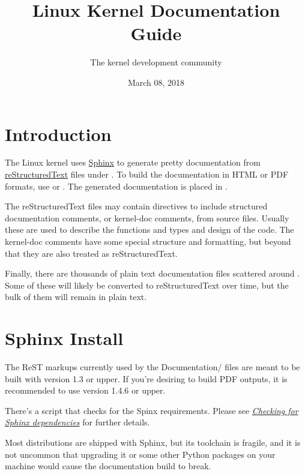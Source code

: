 \documentclass[a4paper,8pt,english]{sphinxmanual}
\title{Linux Kernel Documentation Guide}
\date{March 08, 2018}
\author{The kernel development community}
\begin{document}
\maketitle
\tableofcontents
{}\label{doc-guide/index::doc}



\chapter{Introduction}
\label{doc-guide/sphinx:how-to-write-kernel-documentation}\label{doc-guide/sphinx::doc}\label{doc-guide/sphinx:doc-guide}\label{doc-guide/sphinx:introduction}
The Linux kernel uses \href{http://www.sphinx-doc.org/}{Sphinx} to generate pretty documentation from
\href{http://docutils.sourceforge.net/rst.html}{reStructuredText} files under . To build the documentation in
HTML or PDF formats, use  or . The generated
documentation is placed in .

The reStructuredText files may contain directives to include structured
documentation comments, or kernel-doc comments, from source files. Usually these
are used to describe the functions and types and design of the code. The
kernel-doc comments have some special structure and formatting, but beyond that
they are also treated as reStructuredText.

Finally, there are thousands of plain text documentation files scattered around
. Some of these will likely be converted to reStructuredText
over time, but the bulk of them will remain in plain text.


\chapter{Sphinx Install}
\label{doc-guide/sphinx:sphinx-install}\label{doc-guide/sphinx:id1}
The ReST markups currently used by the Documentation/ files are meant to be
built with  version 1.3 or upper. If you're desiring to build
PDF outputs, it is recommended to use version 1.4.6 or upper.

There's a script that checks for the Spinx requirements. Please see
{\hyperref[doc\string-guide/sphinx:sphinx\string-pre\string-install]{\emph{Checking for Sphinx dependencies}}} for further details.

Most distributions are shipped with Sphinx, but its toolchain is fragile,
and it is not uncommon that upgrading it or some other Python packages
on your machine would cause the documentation build to break.
\end{document}
